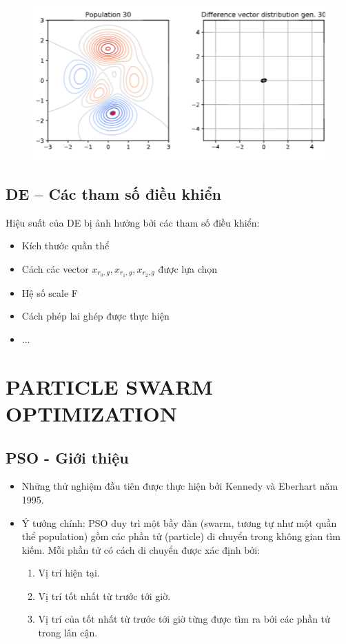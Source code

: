 \documentclass{book}
\begin{document}
\begin{figure}[H]
    \centering
    \includegraphics[width=0.75\linewidth]{images/GA-3_16.png}
\end{figure}

\section{DE – Các tham số điều khiển}

Hiệu suất của DE bị ảnh hưởng bởi các tham số điều khiển:
\begin{itemize}
    \item Kích thước quần thể
    \item Cách các vector $x_{r_0,g}, x_{r_1,g}, x_{r_2,g}$ được lựa chọn
    \item Hệ số scale F
    \item Cách phép lai ghép được thực hiện
    \item ...
\end{itemize}

\chapter{PARTICLE SWARM OPTIMIZATION}

\section{PSO - Giới thiệu}

\begin{itemize}
    \item Những thử nghiệm đầu tiên được thực hiện bởi Kennedy và Eberhart năm 1995.
    \item Ý tưởng chính: PSO duy trì một bầy đàn (swarm, tương tự như một quần thể population) gồm các phần tử (particle) di chuyển trong không gian tìm kiếm. Mỗi phần tử có cách di chuyển được xác định bởi:
    \begin{enumerate}
        \item Vị trí hiện tại.
        \item Vị trí tốt nhất từ trước tới giờ.
        \item Vị trí của tốt nhất từ trước tới giờ từng được tìm ra bởi các phần tử trong lân cận.
    \end{enumerate}
\end{itemize}
\end{document}
